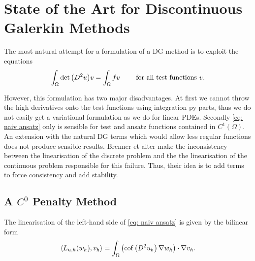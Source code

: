 \section{State of the Art for Discontinuous Galerkin Methods} %

The most natural attempt for a formulation of a DG method is to exploit the equations
\begin{align}
	\int_{\Omega} \det{\left(D^2 u\right)} v = \int_\Omega fv \qquad \text{ for all test functions } v. \label{eq: naiv ansatz}
\end{align}

However, this formulation has two major disadvantages. 
At first we cannot throw the high derivatives onto the test functions using integration py parts, thus we do not easily get a variational formulation as we do for linear PDEs. Secondly \eqref{eq: naiv ansatz} only is sensible for test and ansatz functions contained in $C^1(\Omega)$. An extension with the natural DG terms which would allow less regular functions does not produce sensible results. Brenner et alter make the inconsistency between the linearisation of the discrete problem and the the linearisation of the continuous problem responsible \cite{BGN+2011} for this failure. Thus, their idea is to add terms to force consistency and add stability.

\subsection{A $C^0$ Penalty Method }

The linearisation of the left-hand side of \eqref{eq: naiv ansatz} is given by the bilinear form
\begin{align}
\langle L_{u,h}(w_h),v_h\rangle = \int_{\Omega} \left( \operatorname{cof} \left( D^2 u_h \right) \nabla w_h\right) \cdot \nabla v_h. \label{linearOperator}
\end{align}

